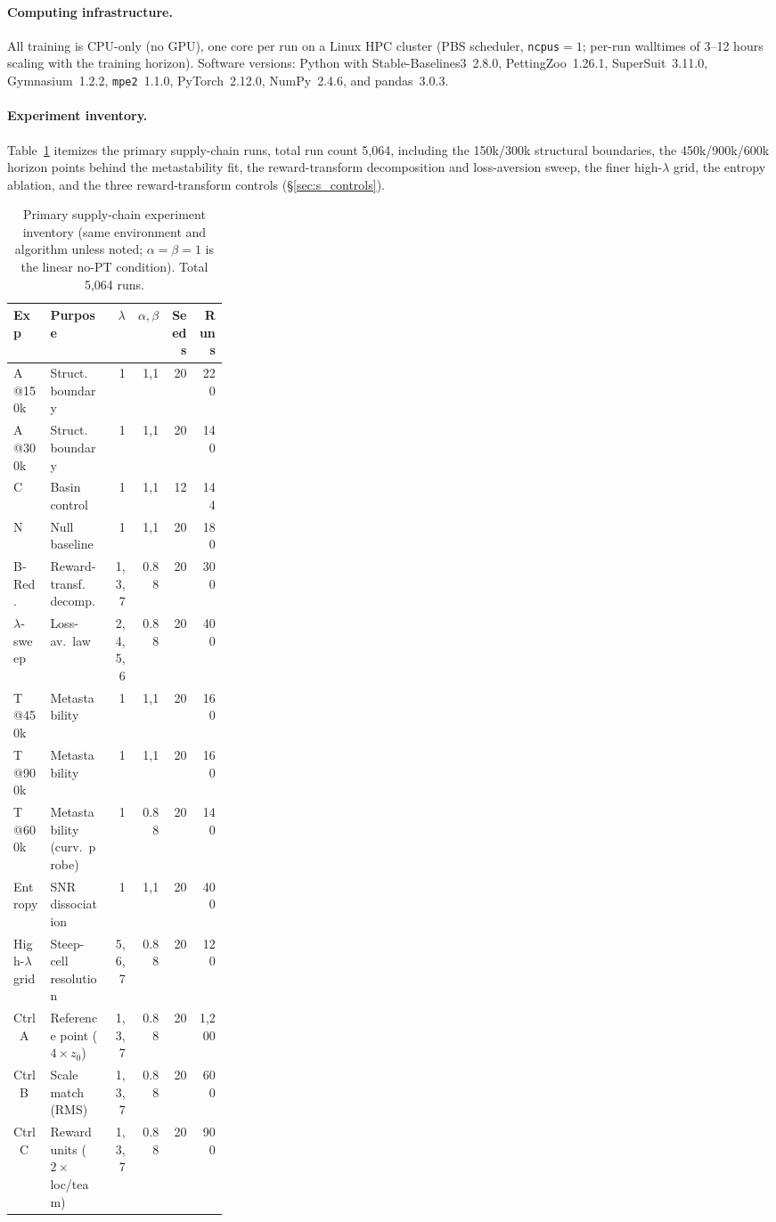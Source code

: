 \documentclass[letterpaper]{article} %
\theoremstyle{plain}
\begin{document}
\paragraph{Computing infrastructure.}
All training is CPU-only (no GPU), one core per run on a Linux HPC cluster (PBS scheduler,
\texttt{ncpus}${=}1$; per-run walltimes of 3--12 hours scaling with the training horizon).
Software versions: Python with Stable-Baselines3~2.8.0, PettingZoo~1.26.1, SuperSuit~3.11.0,
Gymnasium~1.2.2, \texttt{mpe2}~1.1.0, PyTorch~2.12.0, NumPy~2.4.6, and pandas~3.0.3.

\paragraph{Experiment inventory.}
Table~\ref{tab:experiments} itemizes the primary supply-chain runs, total run count 5{,}064,
including the 150k/300k structural boundaries, the 450k/900k/600k horizon points behind the
metastability fit, the reward-transform decomposition and loss-aversion sweep, the finer
high-$\lambda$ grid, the entropy ablation, and the three reward-transform controls
(\S\ref{sec:s_controls}).

\begin{table}[t]
\centering
\caption{Primary supply-chain experiment inventory (same environment and algorithm unless noted;
$\alpha{=}\beta{=}1$ is the linear no-PT condition). Total 5{,}064 runs.}
\label{tab:experiments}
\small
\setlength{\tabcolsep}{3pt}
\begin{tabular}{@{}lp{0.28\linewidth}rrrr@{}}
\toprule
Exp & Purpose & $\lambda$ & $\alpha,\beta$ & Seeds & Runs \\
\midrule
A @150k & Struct.\ boundary & 1 & 1,1 & 20 & 220 \\
A @300k & Struct.\ boundary & 1 & 1,1 & 20 & 140 \\
C & Basin control & 1 & 1,1 & 12 & 144 \\
N & Null baseline & 1 & 1,1 & 20 & 180 \\
B-Red. & Reward-transf.\ decomp. & 1,3,7 & 0.88 & 20 & 300 \\
$\lambda$-sweep & Loss-av.\ law & 2,4,5,6 & 0.88 & 20 & 400 \\
T @450k & Metastability & 1 & 1,1 & 20 & 160 \\
T @900k & Metastability & 1 & 1,1 & 20 & 160 \\
T @600k & Metastability (curv.\ probe) & 1 & 0.88 & 20 & 140 \\
Entropy & SNR dissociation & 1 & 1,1 & 20 & 400 \\
High-$\lambda$ grid & Steep-cell resolution & 5,6,7 & 0.88 & 20 & 120 \\
Ctrl~A & Reference point ($4\times z_0$) & 1,3,7 & 0.88 & 20 & 1{,}200 \\
Ctrl~B & Scale match (RMS) & 1,3,7 & 0.88 & 20 & 600 \\
Ctrl~C & Reward units ($2\times$ loc/team) & 1,3,7 & 0.88 & 20 & 900 \\
\bottomrule
\end{tabular}
\end{table}
\end{document}
